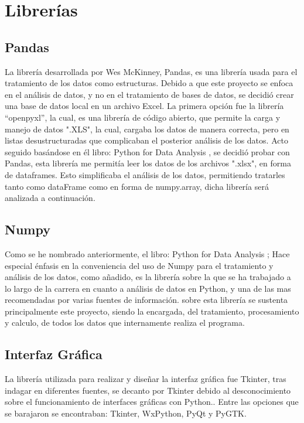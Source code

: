 \section{Librerías}
\subsection{Pandas}
La librería desarrollada por Wes McKinney, Pandas, es una librería usada para el tratamiento de los datos como estructuras. Debido a que este proyecto se enfoca en el análisis de datos, y no en el tratamiento de bases de datos, se decidió crear una base de datos local en un archivo Excel. La primera opción fue la librería “openpyxl”, la cual, es una librería de código abierto, que permite la carga y manejo de datos ".XLS", la cual, cargaba los datos de manera correcta, pero en listas desustructuradas que complicaban el posterior análisis de los datos. Acto seguido basándose en él libro: Python for Data Analysis \cite{analisis}, se decidió probar con Pandas, esta librería me permitía leer los datos de los archivos ".xlsx", en forma de dataframes. Esto simplificaba el análisis de los datos, permitiendo tratarles tanto como dataFrame como en forma de numpy.array, dicha librería será analizada a continuación.
\subsection{Numpy}
Como se he nombrado anteriormente, el libro: Python for Data Analysis \cite{analisis}; Hace especial énfasis en la conveniencia del uso de Numpy para el tratamiento y análisis de los datos, como añadido, es la librería sobre la que se ha  trabajado a lo largo de la carrera en cuanto a análisis de datos en Python, y una de las mas recomendadas por varias fuentes de información. sobre esta librería se sustenta principalmente este proyecto, siendo la encargada, del tratamiento, procesamiento y calculo, de todos los datos que internamente realiza el programa.
\subsection{Interfaz Gráfica}
La librería utilizada para realizar y diseñar la interfaz gráfica fue Tkinter, tras indagar en diferentes fuentes, se decanto por Tkinter debido al desconocimiento sobre el funcionamiento de interfaces gráficas con Python.. Entre las opciones que se barajaron se encontraban: Tkinter, WxPython, PyQt y PyGTK.\\

